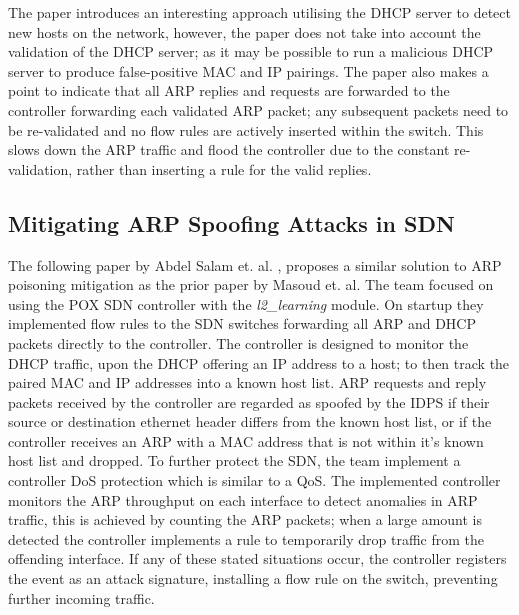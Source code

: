 \documentclass[12pt, oneside]{book}
\begin{document}
The paper introduces an interesting approach utilising the DHCP server to detect new hosts on the network, however, the paper
does not take into account the validation of the DHCP server; as it may be possible to run a malicious DHCP server to produce
false-positive MAC and IP pairings. The paper also makes a point to indicate that all ARP replies and requests are forwarded to the 
controller forwarding each validated ARP packet; any subsequent packets need to be re-validated and no flow
rules are actively inserted within the switch. This slows down the ARP traffic and flood the controller due to the constant
re-validation, rather than inserting a rule for the valid replies.




\subsection{Mitigating ARP Spoofing Attacks in SDN}
\label{subsec:mitigateARPLIT}
The following paper by Abdel Salam et. al. \cite{abdelsalam2015mitigating},
proposes a similar solution to ARP poisoning mitigation as the prior paper by Masoud et. al. The team focused on using the POX SDN
controller with the \emph{l2\_learning} module.
On startup they implemented flow rules to the SDN switches forwarding all ARP and DHCP packets directly to the controller.
The controller is designed to monitor the DHCP traffic, upon the DHCP offering an IP address to a host; to then track the paired MAC
and IP addresses into a known host list. ARP requests and reply packets received by the controller
are regarded as spoofed by the IDPS if their source or destination
ethernet header differs from the known host list, or if the controller receives an ARP with a MAC address that is not within it's known host
list and dropped. To further protect the SDN, the team implement a controller DoS protection which is similar to a QoS.
The implemented controller monitors the ARP throughput on each interface to detect anomalies in ARP traffic, this is achieved by counting the 
ARP packets; when a large amount is detected the controller implements a rule to temporarily drop traffic from the offending interface.
If any of these stated situations occur, the controller registers the event as an attack signature,
installing a flow rule on the switch, preventing further incoming traffic.
\end{document}
